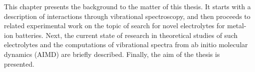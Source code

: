 \label{chapter:introduction}

This chapter presents the background to the matter of this thesis. It starts with a description of interactions through vibrational spectroscopy, and then proceeds to related experimental work on the topic of search for novel electrolytes for metal-ion batteries. Next, the current state of research in theoretical studies of such electrolytes and the computations of vibrational spectra from ab initio molecular dynamics (AIMD) are briefly described. Finally, the aim of the thesis is presented.